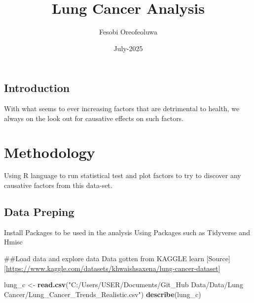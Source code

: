 \documentclass[
]{article}
\title{Lung Cancer Analysis}
\author{Fesobi Oreofeoluwa}
\date{July-2025}
\newenvironment{Shaded}{\begin{snugshade}}{\end{snugshade}}
\newcommand{\FunctionTok}[1]{\textcolor[rgb]{0.13,0.29,0.53}{\textbf{#1}}}
\newcommand{\NormalTok}[1]{#1}
\newcommand{\OtherTok}[1]{\textcolor[rgb]{0.56,0.35,0.01}{#1}}
\newcommand{\StringTok}[1]{\textcolor[rgb]{0.31,0.60,0.02}{#1}}
\begin{document}
\maketitle

\subsection{Introduction}\label{introduction}

With what seems to ever increasing factors that are detrimental to
health, we always on the look out for causative effects on such factors.

\section{Methodology}\label{methodology}

Using R language to run statistical test and plot factors to try to
discover any causative factors from this data-set.

\subsection{Data Preping}\label{data-preping}

Install Packages to be used in the analysis Using Packages such as
Tidyverse and Hmisc

\#\#Load data and explore data Data gotten from KAGGLE learn
{[}Source{]}{[}\url{https://www.kaggle.com/datasets/khwaishsaxena/lung-cancer-dataset}{]}

\begin{Shaded}
\begin{Highlighting}[]
\NormalTok{lung\_c }\OtherTok{\textless{}{-}} \FunctionTok{read.csv}\NormalTok{(}\StringTok{"C:/Users/USER/Documents/Git\_Hub Data/Data/Lung Cancer/Lung\_Cancer\_Trends\_Realistic.csv"}\NormalTok{)}
\FunctionTok{describe}\NormalTok{(lung\_c)}
\end{Highlighting}
\end{Shaded}
\end{document}
